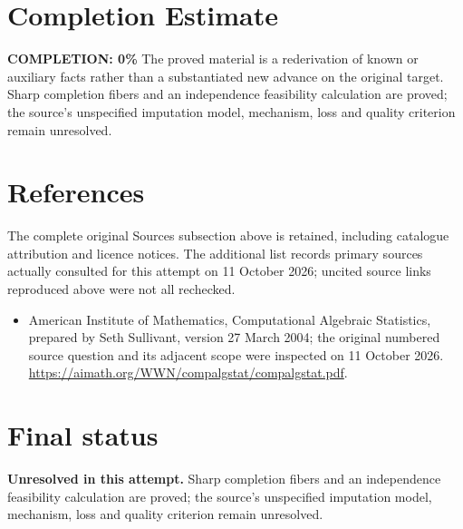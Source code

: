 \documentclass[11pt]{article}
\begin{document}
\section{Completion Estimate}
\noindent\textbf{COMPLETION: 0\%}
The proved material is a rederivation of known or auxiliary facts rather than a substantiated new advance on the original target. Sharp completion fibers and an independence feasibility calculation are proved; the source’s unspecified imputation model, mechanism, loss and quality criterion remain unresolved.
\section{References}
The complete original Sources subsection above is retained, including catalogue attribution and licence notices. The additional list records primary sources actually consulted for this attempt on 11 October 2026; uncited source links reproduced above were not all rechecked.
\begin{itemize}
\item American Institute of Mathematics, Computational Algebraic Statistics, prepared by Seth Sullivant, version 27 March 2004; the original numbered source question and its adjacent scope were inspected on 11 October 2026. \url{https://aimath.org/WWN/compalgstat/compalgstat.pdf}.
\end{itemize}
\section{Final status}
\textbf{Unresolved in this attempt.} Sharp completion fibers and an independence feasibility calculation are proved; the source’s unspecified imputation model, mechanism, loss and quality criterion remain unresolved.
\end{document}
